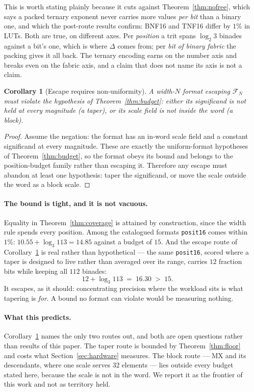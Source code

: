\documentclass[11pt]{article}
\newtheorem{corollary}{Corollary}
\theoremstyle{definition}
\begin{document}
This is worth stating plainly because it cuts against
Theorem~\ref{thm:nofree}, which says a packed ternary exponent never carries
more values \emph{per bit} than a binary one, and which the post-route results
confirm:
BNF16 and TNF16 differ by $1\%$ in LUTs. Both are true, on different axes. Per
\emph{position} a trit spans $\log_2 3$ binades against a bit's one, which is
where $\Delta$ comes from; per \emph{bit of binary fabric} the packing gives it
all back. The ternary encoding earns on the number axis and breaks even on the
fabric axis, and a claim that does not name its axis is not a claim.

\begin{corollary}[Escape requires non-uniformity]
\label{cor:escape}
A width-$N$ format escaping $\mathcal{F}_N$ must violate the hypothesis of
Theorem~\ref{thm:budget}: either its significand is not held at every magnitude
(a taper), or its scale field is not inside the word (a block).
\end{corollary}
\begin{proof}
Assume the negation: the format has an in-word scale field and a constant
significand at every magnitude.  These are exactly the uniform-format
hypotheses of Theorem~\ref{thm:budget}, so the format obeys its bound and
belongs to the position-budget family rather than escaping it.  Therefore any
escape must abandon at least one hypothesis: taper the significand, or move the
scale outside the word as a block scale.
\end{proof}

\paragraph{The bound is tight, and it is not vacuous.} Equality in
Theorem~\ref{thm:coverage} is attained by construction, since the width rule
spends every position. Among the catalogued formats \texttt{posit16} comes within
$1\%$: $10.55 + \log_3 113 = 14.85$ against a budget of $15$. And the escape route
of Corollary~\ref{cor:escape} is real rather than hypothetical --- the same
\texttt{posit16}, scored where a taper is designed to live rather than averaged
over its range, carries $12$ fraction bits while keeping all $112$ binades:
\[
  12 + \log_3 113 \;=\; 16.30 \;>\; 15 .
\]
It escapes, as it should: concentrating precision where the workload sits is what
tapering is \emph{for}. A bound no format can violate would be measuring nothing.

\paragraph{What this predicts.} Corollary~\ref{cor:escape} names the only two
routes out, and both are open questions rather than results of this paper. The
taper route is bounded by Theorem~\ref{thm:floor} and costs what
Section~\ref{sec:hardware} measures. The block route --- MX and its descendants,
where one scale serves 32 elements --- lies outside every budget stated here,
because the scale is not in the word. We report it as the frontier of this work
and not as territory held.
\end{document}
